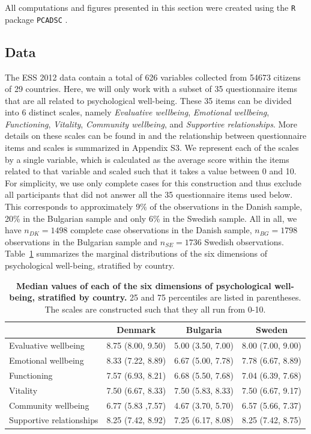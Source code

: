 \documentclass[a4paper,12pt]{article}
\newcommand{\R}[1]{\texttt{#1}}
\begin{document}
All computations and figures presented in this section were created using the \R{R} package \R{PCADSC} \cite{PCADSC}.


\subsection*{Data}


The ESS 2012 data contain a total of 626 variables collected from 54673 citizens of 29 countries. Here, we will only work with a subset of 35 questionnaire items that are all related to psychological well-being. These 35 items can be divided into 6 distinct scales, namely \textit{Evaluative wellbeing}, \textit{Emotional wellbeing}, \textit{Functioning}, \textit{Vitality}, \textit{Community wellbeing}, and \textit{Supportive relationships}. More details on these scales can be found in \cite{ESStopline5} and the relationship between questionnaire items and scales is summarized in Appendix S3. We represent each of the scales by a single variable, which is calculated as the average score within the items related to that variable and scaled such that it takes a value between 0 and 10. For simplicity, we use only complete cases for this construction and thus exclude all participants that did not answer all the 35 questionnaire items used below. This corresponds to approximately 9\% of the observations in the Danish sample, 20\% in the Bulgarian sample and only 6\% in the Swedish sample. All in all, we have $n_{DK} = 1498$ complete case observations in the Danish sample, $n_{BG} = 1798$ observations in the Bulgarian sample and $n_{SE} = 1736$ Swedish observations. Table~\ref{tableDistr} summarizes the marginal distributions of the six dimensions of psychological well-being, stratified by country.

\begin{table}[ht]
\centering
\caption{\textbf{Median values of each of the six dimensions of psychological well-being, stratified by country.} 25 and 75 percentiles are listed in parentheses. The scales are constructed such that they all run from 0-10.} 
\label{tableDistr}

\begin{tabular}{lccc}
\hline
  & Denmark & Bulgaria & Sweden \\
\hline
Evaluative wellbeing    & 8.75 (8.00, 9.50) & 5.00 (3.50, 7.00) & 8.00 (7.00, 9.00) \\
Emotional wellbeing     & 8.33 (7.22, 8.89) & 6.67 (5.00, 7.78) & 7.78 (6.67, 8.89) \\
Functioning             & 7.57 (6.93, 8.21) & 6.68 (5.50, 7.68) & 7.04 (6.39, 7.68) \\
Vitality                & 7.50 (6.67, 8.33) & 7.50 (5.83, 8.33) & 7.50 (6.67, 9.17) \\
Community wellbeing     & 6.77 (5.83 ,7.57) & 4.67 (3.70, 5.70) & 6.57 (5.66, 7.37) \\
Supportive relationships& 8.25 (7.42, 8.92) & 7.25 (6.17, 8.08) & 8.25 (7.42, 8.75) \\
\hline
\end{tabular} 
\end{table}
\end{document}

